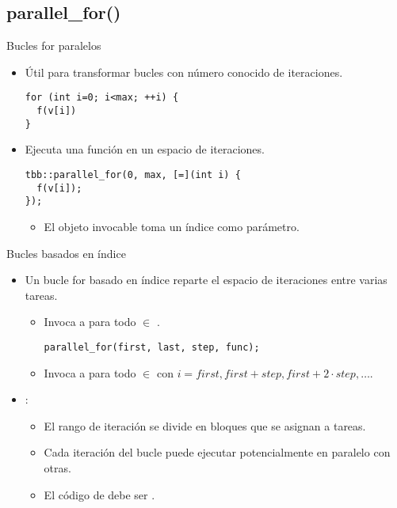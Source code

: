 \subsection{parallel\_for()}

\begin{frame}[t,fragile]{Bucles for paralelos}
\begin{itemize}
  \item Útil para transformar bucles con número conocido de iteraciones.
\begin{lstlisting}
for (int i=0; i<max; ++i) {
  f(v[i])
}
\end{lstlisting}

  \item Ejecuta una función en un espacio de iteraciones.
\begin{lstlisting}
tbb::parallel_for(0, max, [=](int i) {
  f(v[i]);
});
\end{lstlisting}
    \begin{itemize}
      \item El objeto invocable toma un índice como parámetro.
    \end{itemize}
\end{itemize}
\end{frame}

\begin{frame}[t,fragile]{Bucles basados en índice}
\begin{itemize}
  \item Un bucle for basado en índice reparte el espacio de iteraciones
        entre varias tareas.
    \begin{itemize}
\begin{lstlisting}
parallel_for(first, last, func);
\end{lstlisting}
      \item Invoca a  para todo  $\in$ \cppid{[first,last)}.

\begin{lstlisting}
parallel_for(first, last, step, func);
\end{lstlisting}
      \item Invoca a  para todo  $\in$ \cppid{[first,last)} 
            con $i=first, first + step, first + 2 \cdot step, \ldots$.
    \end{itemize}

  \item {}:
    \begin{itemize}
      \item El rango de iteración se divide en bloques que se asignan a tareas.
      \item Cada iteración del bucle puede ejecutar potencialmente en paralelo con otras.
      \item El código de  debe ser .
    \end{itemize}
\end{itemize}
\end{frame}

